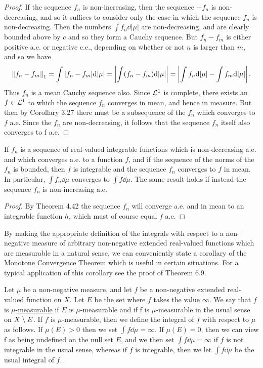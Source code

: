 \begin{proof}
If the sequence $f_n$ is non-increasing, then the sequence $-f_n$ is non-decreasing, and so it suffices to consider only the case in which the sequence $f_n$ is non-decreasing. Then the numbers $\int f_n\dd|\mu|$ are non-decreasing, and are clearly bounded above by $c$ and so they form a Cauchy sequence. But $f_n-f_m$ is either positive a.e. or negative c.e., depending on whether or not $n$ is larger than $m$, and so we have $$\norm{f_n-f_m}_1=\int|f_n-f_m|\dd|\mu|=\left\lvert\int(f_n-f_m)\dd|\mu|\right\rvert=\left\lvert\int f_n\dd|\mu|-\int f_m\dd|\mu|\right\rvert.$$ Thus $f_n$ is a mean Cauchy sequence also. Since ${\cal L}^1$ is complete, there exists an $f\in{\cal L}^1$ to which the sequence $f_n$ converges in mean, and hence in measure. But then by Corollary 3.27 there must be a subsequence of the $f_n$ which converges to $f$ a.e. Since the $f_n$ are non-decreasing, it follows that the sequence $f_n$ itself also converges to f a.e.
\end{proof}

\begin{corollary}
If $f_n$ is a sequence of real-valued integrable functions which is non-decreasing a.e. and which converges a.e. to a function $f$, and if the sequence of the norms of the $f_n$ is bounded, then $f$ is integrable and the sequence $f_n$ converges to $f$ in mean. In particular, $\int f_n\dd\mu$ converges to $\int f\dd\mu$. The same result holds if instead the sequence $f_n$ is non-increasing a.e.
\end{corollary} 

\begin{proof}
By Theorem 4.42 the sequence $f_n$ will converge a.e. and in mean to an integrable function $h$, which must of course equal $f$ a.e.
\end{proof}

By making the appropriate definition of the integrals with respect to a non-negative measure of arbitrary non-negative extended real-valued functions which are measurable in a natural sense, we can conveniently state a corollary of the Monotone Convergence Theorem which is useful in certain situations. For a typical application of this corollary see the proof of Theorem 6.9.

\begin{definition}
Let $\mu$ be a non-negative measure, and let $f$ be a non-negative extended real-valued function on $X$. Let $E$ be the set where $f$ takes the value $\infty$. We say that $f$ is \underline{$\mu$-measurable} if $E$ is $\mu$-measurable and if f is $\mu$-measurable in the usual sense on $X\setminus E$. If $f$ is $\mu$-measurable, then we define the integral of $f$ with respect to $\mu$ as follows. If $\mu(E)>0$ then we set $\int f\dd\mu=\infty$. If $\mu(E)=0$, then we can view f as being undefined on the null set $E$, and we then set $\int f\dd\mu=\infty$ if $f$ is not integrable in the usual sense, whereas if $f$ is integrable, then we let $\int f\dd\mu$ be the usual integral of $f$.
\end{definition}


